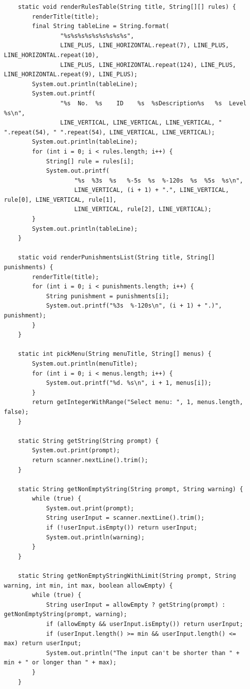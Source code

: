 \documentclass[12pt,titlepage]{article}
\begin{document}
\begin{verbatim}
    static void renderRulesTable(String title, String[][] rules) {
        renderTitle(title);
        final String tableLine = String.format(
                "%s%s%s%s%s%s%s%s%s",
                LINE_PLUS, LINE_HORIZONTAL.repeat(7), LINE_PLUS, LINE_HORIZONTAL.repeat(10),
                LINE_PLUS, LINE_HORIZONTAL.repeat(124), LINE_PLUS, LINE_HORIZONTAL.repeat(9), LINE_PLUS);
        System.out.println(tableLine);
        System.out.printf(
                "%s  No.  %s    ID    %s  %sDescription%s   %s  Level  %s\n",
                LINE_VERTICAL, LINE_VERTICAL, LINE_VERTICAL, " ".repeat(54), " ".repeat(54), LINE_VERTICAL, LINE_VERTICAL);
        System.out.println(tableLine);
        for (int i = 0; i < rules.length; i++) {
            String[] rule = rules[i];
            System.out.printf(
                    "%s  %3s  %s   %-5s  %s  %-120s  %s  %5s  %s\n",
                    LINE_VERTICAL, (i + 1) + ".", LINE_VERTICAL, rule[0], LINE_VERTICAL, rule[1],
                    LINE_VERTICAL, rule[2], LINE_VERTICAL);
        }
        System.out.println(tableLine);
    }

    static void renderPunishmentsList(String title, String[] punishments) {
        renderTitle(title);
        for (int i = 0; i < punishments.length; i++) {
            String punishment = punishments[i];
            System.out.printf("%3s  %-120s\n", (i + 1) + ".)", punishment);
        }
    }

    static int pickMenu(String menuTitle, String[] menus) {
        System.out.println(menuTitle);
        for (int i = 0; i < menus.length; i++) {
            System.out.printf("%d. %s\n", i + 1, menus[i]);
        }
        return getIntegerWithRange("Select menu: ", 1, menus.length, false);
    }

    static String getString(String prompt) {
        System.out.print(prompt);
        return scanner.nextLine().trim();
    }

    static String getNonEmptyString(String prompt, String warning) {
        while (true) {
            System.out.print(prompt);
            String userInput = scanner.nextLine().trim();
            if (!userInput.isEmpty()) return userInput;
            System.out.println(warning);
        }
    }

    static String getNonEmptyStringWithLimit(String prompt, String warning, int min, int max, boolean allowEmpty) {
        while (true) {
            String userInput = allowEmpty ? getString(prompt) : getNonEmptyString(prompt, warning);
            if (allowEmpty && userInput.isEmpty()) return userInput;
            if (userInput.length() >= min && userInput.length() <= max) return userInput;
            System.out.println("The input can't be shorter than " + min + " or longer than " + max);
        }
    }


\end{verbatim}
\end{document}
